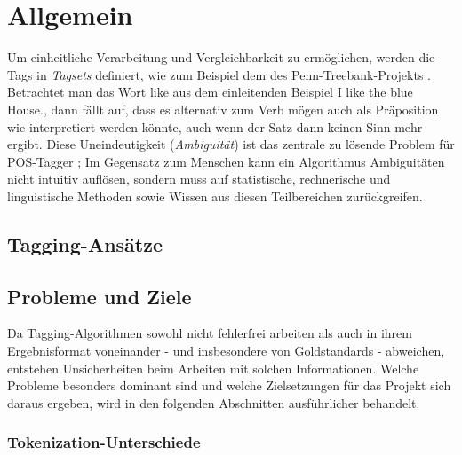 %
\chapter{Allgemein}
\label{sec:general}

Um einheitliche Verarbeitung und Vergleichbarkeit zu ermöglichen, werden die Tags in \textit{Tagsets} definiert, wie zum Beispiel dem des Penn-Treebank-Projekts \linebreak \cite{Web:PennBank:2003}. \newline
Betrachtet man das Wort \glqq like \grqq{} aus dem einleitenden Beispiel \glqq I like the blue House.\grqq, dann fällt auf, dass es alternativ zum Verb \glqq mögen\grqq{} auch als Präposition \glqq wie\grqq{} interpretiert werden könnte, auch wenn der Satz dann keinen Sinn mehr ergibt. Diese Uneindeutigkeit (\textit{Ambiguität}) ist das zentrale zu lösende Problem für POS-Tagger  \cite{Smith:2011}; Im Gegensatz zum Menschen kann ein Algorithmus Ambiguitäten nicht intuitiv auflösen, sondern muss auf statistische, rechnerische und linguistische Methoden sowie Wissen aus diesen Teilbereichen zurückgreifen. \newline

\section{Tagging-Ansätze}
\label{sec:general:types}

\section{Probleme und Ziele}
\label{sec:general:goals}

Da Tagging-Algorithmen sowohl nicht fehlerfrei arbeiten als auch in ihrem Ergebnisformat voneinander - und insbesondere von Goldstandards - abweichen, entstehen Unsicherheiten beim Arbeiten mit solchen Informationen. Welche Probleme besonders dominant sind und welche Zielsetzungen für das Projekt sich daraus ergeben, wird in den folgenden Abschnitten ausführlicher behandelt.

\subsection{Tokenization-Unterschiede}
\label{sec:general:goals:tok}

